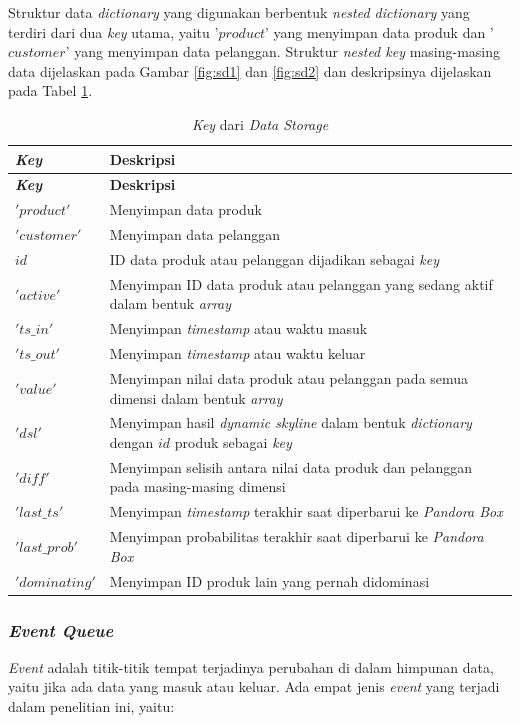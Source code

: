 Struktur data \textit{dictionary} yang digunakan berbentuk \textit{nested dictionary} yang terdiri dari dua \textit{key} utama, yaitu '$product$' yang menyimpan data produk dan '$customer$' yang menyimpan data pelanggan. Struktur \textit{nested key} masing-masing data dijelaskan pada Gambar \ref{fig:sd1} dan \ref{fig:sd2} dan deskripsinya dijelaskan pada Tabel \ref{tab:desc-key}.

\begin{longtable}{| p{2.5cm} | p{6.5cm} |}
	\caption{\textit{Key} dari \textit{Data Storage} \label{tab:desc-key}}\\
	\hline
	\textbf{\textit{Key}} & \textbf{Deskripsi} \\ \hline 
	\endfirsthead
	\hline
	\textbf{\textit{Key}} & \textbf{Deskripsi} \\ \hline 
	\endhead
	$'product'$ & Menyimpan data produk \\ \hline
	$'customer'$ & Menyimpan data pelanggan \\ \hline
	$id$ & ID data produk atau pelanggan dijadikan sebagai \textit{key} \\ \hline
	$'active'$ & Menyimpan ID data produk atau pelanggan yang sedang aktif dalam bentuk \textit{array} \\ \hline
	$'ts\_in'$ & Menyimpan \textit{timestamp} atau waktu masuk \\ \hline
	$'ts\_out'$ & Menyimpan \textit{timestamp} atau waktu keluar \\ \hline
	$'value'$ & Menyimpan nilai data produk atau pelanggan pada semua dimensi dalam bentuk \textit{array}\\ \hline
	$'dsl'$ & Menyimpan hasil \textit{dynamic skyline} dalam bentuk \textit{dictionary} dengan $id$ produk sebagai \textit{key}\\ \hline
	$'diff'$ & Menyimpan selisih antara nilai data produk dan pelanggan pada masing-masing dimensi \\ \hline
	$'last\_ts'$ & Menyimpan \textit{timestamp} terakhir saat diperbarui ke \textit{Pandora Box}\\ \hline
	$'last\_prob'$ & Menyimpan probabilitas terakhir saat diperbarui ke \textit{Pandora Box}\\ \hline
	$'dominating'$ & Menyimpan ID produk lain yang pernah didominasi\\ \hline
\end{longtable}

\subsubsection{\textit{Event Queue}}
\tab \textit{Event} adalah titik-titik tempat terjadinya perubahan di dalam himpunan data, yaitu jika ada data yang masuk atau keluar. Ada empat jenis \textit{event} yang terjadi dalam penelitian ini, yaitu:

